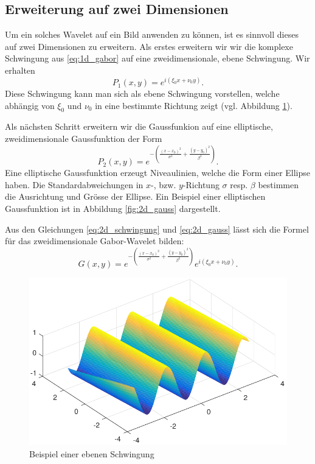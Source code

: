 \subsection{Erweiterung auf zwei Dimensionen}\label{subsec:2D}

Um ein solches Wavelet auf ein Bild anwenden zu können, ist es sinnvoll dieses auf zwei Dimensionen zu erweitern.
Als erstes erweitern wir wir die komplexe Schwingung aus \ref{eq:1d_gabor} auf eine zweidimensionale, ebene Schwingung.
Wir erhalten
\begin{equation}\label{eq:2d_schwingung}
P_1(x,y)= e^{i(\xi_{0}x+\nu_{0}y)}.
\end{equation}
Diese Schwingung kann man sich als ebene Schwingung vorstellen, welche abhängig von $\xi_0$ und $\nu_0$ in eine bestimmte Richtung zeigt (vgl. Abbildung \ref{fig:planarwave}).

Als nächsten Schritt erweitern wir die Gaussfunkion auf eine elliptische, zweidimensionale Gaussfunktion der Form
\begin{equation}\label{eq:2d_gauss}
P_2(x,y)=e^{-(\frac{(x-x_{0})^{2}}{\sigma^{2}}+\frac{(y-y_{0})^{2}}{\beta^{2}})}.
\end{equation}
Eine elliptische Gaussfunktion erzeugt Niveaulinien, welche die Form einer Ellipse haben.
Die Standardabweichungen in $x$-, bzw. $y$-Richtung $\sigma$ resp. $\beta$ bestimmen die Ausrichtung und Grösse der Ellipse.
Ein Beispiel einer elliptischen Gaussfunktion ist in Abbildung \ref{fig:2d_gauss} dargestellt.

Aus den Gleichungen \ref{eq:2d_schwingung} und \ref{eq:2d_gauss} lässt sich die Formel für das zweidimensionale Gabor-Wavelet bilden:
\begin{equation}
G(x,y)= e^{-(\frac{(x-x_{0})^{2}}{\sigma^{2}}+\frac{(y-y_{0})^{2}}{\beta^{2}})}
e^{i(\xi_{0}x+\nu_{0}y)}.
\end{equation}

\begin{figure}
	\centering
	\includegraphics[width=0.7\linewidth]{./papers/visuell/images/planarwave.pdf}
	\caption{Beispiel einer ebenen Schwingung}
	\label{fig:planarwave}
\end{figure}

